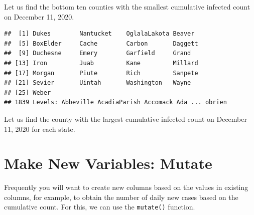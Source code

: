 \documentclass[]{book}
\newenvironment{Shaded}{\begin{snugshade}}{\end{snugshade}}
\newcommand{\KeywordTok}[1]{\textcolor[rgb]{0.13,0.29,0.53}{\textbf{#1}}}
\newcommand{\DataTypeTok}[1]{\textcolor[rgb]{0.13,0.29,0.53}{#1}}
\newcommand{\DecValTok}[1]{\textcolor[rgb]{0.00,0.00,0.81}{#1}}
\newcommand{\FloatTok}[1]{\textcolor[rgb]{0.00,0.00,0.81}{#1}}
\newcommand{\StringTok}[1]{\textcolor[rgb]{0.31,0.60,0.02}{#1}}
\newcommand{\CommentTok}[1]{\textcolor[rgb]{0.56,0.35,0.01}{\textit{#1}}}
\newcommand{\OperatorTok}[1]{\textcolor[rgb]{0.81,0.36,0.00}{\textbf{#1}}}
\newcommand{\NormalTok}[1]{#1}
\begin{document}
Let us find the bottom ten counties with the smallest cumulative
infected count on December 11, 2020.

\begin{Shaded}
\end{Shaded}

\begin{verbatim}
##  [1] Dukes        Nantucket    OglalaLakota Beaver      
##  [5] BoxElder     Cache        Carbon       Daggett     
##  [9] Duchesne     Emery        Garfield     Grand       
## [13] Iron         Juab         Kane         Millard     
## [17] Morgan       Piute        Rich         Sanpete     
## [21] Sevier       Uintah       Washington   Wayne       
## [25] Weber       
## 1839 Levels: Abbeville AcadiaParish Accomack Ada ... obrien
\end{verbatim}

Let us find the county with the largest cumulative infected count on
December 11, 2020 for each state.

\begin{Shaded}
\end{Shaded}

\section{Make New Variables: Mutate}\label{make-new-variables-mutate}

Frequently you will want to create new columns based on the values in
existing columns, for example, to obtain the number of daily new cases
based on the cumulative count. For this, we can use the
\texttt{mutate()} function.
\end{document}
